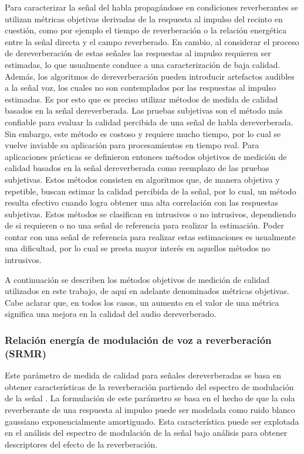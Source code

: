 Para caracterizar la señal del habla propagándose en condiciones reverberantes se utilizan métricas objetivas derivadas de la respuesta al impulso del recinto en cuestión, como por ejemplo el tiempo de reverberación o la relación energética entre la señal directa y el campo reverberado. En cambio, al considerar el proceso de dereverberación de estas señales las respuestas al impulso requieren ser estimadas, lo que usualmente conduce a una caracterización de baja calidad. Además, los algoritmos de dereverberación pueden introducir artefactos audibles a la señal voz, los cuales no son contemplados por las respuestas al impulso estimadas. Es por esto que es preciso utilizar métodos de medida de calidad basados en la señal dereverberada. Las pruebas subjetivas son el método más confiable para evaluar la calidad percibida de una señal de habla dereverberada. Sin embargo, este método es costoso y requiere mucho tiempo, por lo cual se vuelve inviable su aplicación para procesamientos en tiempo real. Para aplicaciones prácticas se definieron entonces métodos objetivos de medición de calidad basados en la señal dereverberada como reemplazo de las pruebas subjetivas. Estos métodos consisten en algoritmos que, de manera objetiva y repetible, buscan estimar la calidad percibida de la señal, por lo cual, un método resulta efectivo cuando logra obtener una alta correlación con las respuestas subjetivas. Estos métodos se clasifican en intrusivos o no intrusivos, dependiendo de si requieren o no una señal de referencia para realizar la estimación. Poder contar con una señal de referencia para realizar estas estimaciones es usualmente una dificultad, por lo cual se presta mayor interés en aquellos métodos no intrusivos. 

A continuación se describen los métodos objetivos de medición de calidad utilizados en este trabajo, de aquí en adelante denominados métricas objetivas. Cabe aclarar que, en todos los casos, un aumento en el valor de una métrica significa una mejora en la calidad del audio dereverberado.

\subsubsection{Relación energía de modulación de voz a reverberación (SRMR)}

Este parámetro de medida de calidad para señales dereverberadas se basa en obtener características de la reverberación partiendo del espectro de modulación de la señal \cite{SRMR}. La formulación de este parámetro se basa en el hecho de que la cola reverberante de una respuesta al impulso puede ser modelada como ruido blanco gaussiano exponencialmente amortiguado. Esta característica puede ser explotada en el análisis del espectro de modulación de la señal bajo análisis para obtener descriptores del efecto de la reverberación.

